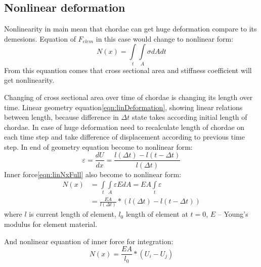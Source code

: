 \subsection*{Nonlinear deformation}
Nonlinearity in main mean that chordae can get huge deformation compare to
its demesions. Equation of $F_{elem}$ in this case  would change to
nonlinear form:
\begin{equation}\label{eqn:nonlinNx}
  N(x)= \int\limits_t\int\limits_A \sigma dAdt
\end{equation}
From this equantion comes that cross sectional area and stiffness coefficient
will get nonlinearity.
\par
Changing of cross sectional area over time of chordae is changing its length
over time. Linear geometry equation\eqref{eqn:linDeformation}, showing linear
relations between length, because difference in $\Delta t$ state takes according
initial length of chordae. In case of huge deformation need to recalculate
length of chordae on each time step and take difference of displacement
according to previous time step. In end of geometry equation become to nonlinear
form:
\begin{equation}\label{eqn:nonlinDeformation}
  \varepsilon=\frac{dU}{dx}=\frac{l(\Delta t)-l(t-\Delta t)}{l(\Delta t)}
\end{equation}
Inner force\eqref{eqn:linNxFull} also become to nonlinear form:
\begin{equation}\label{eqn:nonlinNxFull}
  \begin{split}
    N(x) &=  \int\limits_t\int\limits_A \varepsilon EdA=EA\int\limits_t\varepsilon \\
    &=\frac{EA}{l(\Delta t)}*(l(\Delta t)-l(t-\Delta t))
  \end{split}
\end{equation}
where $l$ is current length of element, $l_0$ length of element at $t=0$, $E$ –
Young’s modulus for element material.\par And nonlinear equantion of inner force
for integration:
\begin{equation}\label{eqn:nonlinNxWdispl}
  N(x)=\frac{EA}{l_0}*(U_{i}-U_{j})
\end{equation}\par

